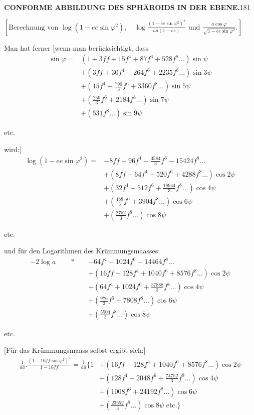 \par\clearpage
\noindent\null\hfill{\small\textbf{CONFORME ABBILDUNG DES SPHÄROIDS IN DER EBENE.}}\hfill181\par\medskip
{\centering [27.]\par\medskip
\(\left[\text{Berechnung von }\log(1-ee\sin\varphi^2),\quad
\log\frac{(1-ee\sin\varphi^2)^2}{aa(1-ee)}\text{ und }\frac{a\cos\varphi}{\sqrt{1-ee\sin\varphi^2}}.\right]\)\par}
Man hat ferner [wenn man berücksichtigt, dass
\[
\begin{aligned}
\sin\varphi={}&(1+3ff+15f^4+87f^6+528f^8\ldots)\sin\psi\\
&+(3ff+30f^4+264f^6+2235f^8\ldots)\sin3\psi\\
&+(15f^4+\tfrac{790}{3}f^6+3360f^8\ldots)\sin5\psi\\
&+(\tfrac{259}{3}f^6+2184f^8\ldots)\sin7\psi\\
&+(531f^8\ldots)\sin9\psi
\end{aligned}
\]
{\centering etc.\par}
\noindent wird:]
\[
\begin{aligned}
\log(1-ee\sin\varphi^2)={}&-8ff-96f^4-\tfrac{3584}{3}f^6-15424f^8\ldots\\
&+(8ff+64f^4+520f^6+4288f^8\ldots)\cos2\psi\\
&+(32f^4+512f^6+\tfrac{18944}{3}f^8\ldots)\cos4\psi\\
&+(\tfrac{488}{3}f^6+3904f^8\ldots)\cos6\psi\\
&+(\tfrac{2752}{3}f^8\ldots)\cos8\psi
\end{aligned}
\]
{\centering etc.\par}
\noindent und für den Logarithmen des Krümmungsmaasses:
\[
\begin{aligned}
-2\log a\qquad\ast\quad&-64f^4-1024f^6-14464f^8\ldots\\
&+(16ff+128f^4+1040f^6+8576f^8\ldots)\cos2\psi\\
&+(64f^4+1024f^6+\tfrac{37888}{3}f^8\ldots)\cos4\psi\\
&+(\tfrac{976}{3}f^6+7808f^8\ldots)\cos6\psi\\
&+(\tfrac{5504}{3}f^8\ldots)\cos8\psi
\end{aligned}
\]
{\centering etc.\par}
[Für das Krümmungsmaass selbst ergibt sich:]
\[
\begin{aligned}
\frac1{aa}.\frac{(1-16ff\sin\varphi^2)^2}{1-16ff}=\frac1{aa}\biggl\{1&+(16ff+128f^4+1040f^6+8576f^8\ldots)\cos2\psi\\
&+(128f^4+2048f^6+\tfrac{74752}{3}f^8\ldots)\cos4\psi\\
&+(1008f^6+24192f^8\ldots)\cos6\psi\\
&+(\tfrac{23552}{3}f^8\ldots)\cos8\psi\text{ etc.}\biggr\}
\end{aligned}
\]
